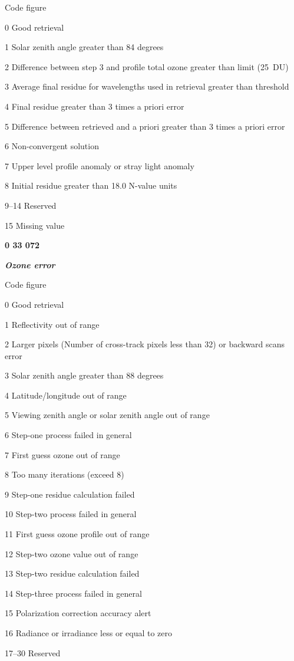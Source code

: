 Code figure

0 Good retrieval

1 Solar zenith angle greater than 84 degrees

2 Difference between step 3 and profile total ozone greater than limit (25~DU)

3 Average final residue for wavelengths used in retrieval greater than threshold

4 Final residue greater than 3 times a priori error

5 Difference between retrieved and a priori greater than 3 times a priori error

6 Non-convergent solution

7 Upper level profile anomaly or stray light anomaly

8 Initial residue greater than 18.0 N-value units

9--14 Reserved

15 Missing value

\textbf{0 33 072}

\emph{\textbf{Ozone error}}

Code figure

0 Good retrieval

1 Reflectivity out of range

2 Larger pixels (Number of cross-track pixels less than 32) or backward scans error

3 Solar zenith angle greater than 88 degrees

4 Latitude/longitude out of range

5 Viewing zenith angle or solar zenith angle out of range

6 Step-one process failed in general

7 First guess ozone out of range

8 Too many iterations (exceed 8)

9 Step-one residue calculation failed

10 Step-two process failed in general

11 First guess ozone profile out of range

12 Step-two ozone value out of range

13 Step-two residue calculation failed

14 Step-three process failed in general

15 Polarization correction accuracy alert

16 Radiance or irradiance less or equal to zero

17--30 Reserved

